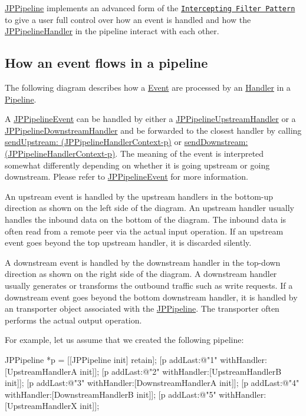\hyperlink{a00019}{JPPipeline} implements an advanced form of the \href{http://java.sun.com/blueprints/corej2eepatterns/Patterns/InterceptingFilter.html}{\tt Intercepting Filter Pattern} to give a user full control over how an event is handled and how the \hyperlink{a00029}{JPPipelineHandler} in the pipeline interact with each other.

\subsection*{How an event flows in a pipeline}

The following diagram describes how a \hyperlink{a00023}{Event} are processed by an \hyperlink{a00029}{Handler} in a \hyperlink{a00019}{Pipeline}. 

A \hyperlink{a00023}{JPPipelineEvent} can be handled by either a \hyperlink{a00035}{JPPipelineUpstreamHandler} or a \hyperlink{a00021}{JPPipelineDownstreamHandler} and be forwarded to the closest handler by calling \hyperlink{a00030_a9ab02ec0933865652634c54595ff7dd7}{sendUpstream: (JPPipelineHandlerContext-\/p)} or \hyperlink{a00030_a292ed51fe0b2e1ce6b2ed517be5fa5e8}{sendDownstream: (JPPipelineHandlerContext-\/p)}. The meaning of the event is interpreted somewhat differently depending on whether it is going upstream or going downstream. Please refer to \hyperlink{a00023}{JPPipelineEvent} for more information.



An upstream event is handled by the upstream handlers in the bottom-\/up direction as shown on the left side of the diagram. An upstream handler usually handles the inbound data on the bottom of the diagram. The inbound data is often read from a remote peer via the actual input operation. If an upstream event goes beyond the top upstream handler, it is discarded silently. 

A downstream event is handled by the downstream handler in the top-\/down direction as shown on the right side of the diagram. A downstream handler usually generates or transforms the outbound traffic such as write requests. If a downstream event goes beyond the bottom downstream handler, it is handled by an transporter object associated with the \hyperlink{a00019}{JPPipeline}. The transporter often performs the actual output operation. 

For example, let us assume that we created the following pipeline: 
\begin{DoxyCode}
 JPPipeline *p = [[JPPipeline init] retain];
 [p addLast:@"1" withHandler:[UpstreamHandlerA init]];
 [p addLast:@"2" withHandler:[UpstreamHandlerB init]];
 [p addLast:@"3" withHandler:[DownstreamHandlerA init]];
 [p addLast:@"4" withHandler:[DownstreamHandlerB init]];
 [p addLast:@"5" withHandler:[UpstreamHandlerX init]];
\end{DoxyCode}


